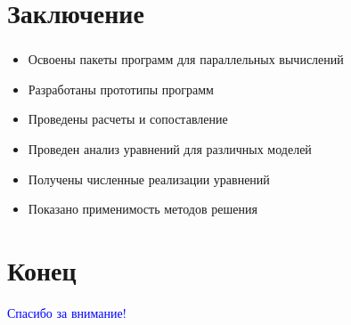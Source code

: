 \section{Заключение}

\begin{frame}
\frametitle{\insertsection}
\framesubtitle{\insertsubsection}

\begin{itemize}
    \item Освоены пакеты программ для параллельных вычислений
    \item Разработаны прототипы программ
    \item Проведены расчеты и сопоставление
    \item Проведен анализ уравнений для различных моделей
    \item Получены численные реализации уравнений
    \item Показано применимость методов решения
\end{itemize}
\end{frame}


\section{Конец}

\begin{frame}[plain]
\centering
\btVFill
\textcolor{Blue}{\Large Спасибо за внимание!}
\btVFill
\end{frame}
